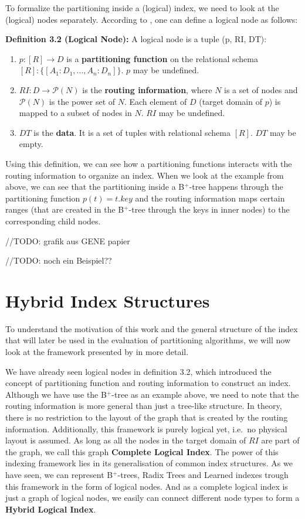 To formalize the partitioning inside a (logical) index, we need to look at the (logical) nodes separately. According to \citeauthor{Dittrich2021} \cite{Dittrich2021}, one can define a logical node as follows:

\vspace{0.5cm}
\noindent \textbf{Definition 3.2 (Logical Node):}
A logical node is a tuple (p, RI, DT):
\begin{enumerate}
    \item $p: [R] \rightarrow D$ is a \textbf{partitioning function} on the relational schema $[R] : \{ [A_1 : D_1, ..., A_n : D_n] \}$. $p$ may be undefined.
    \item $RI : D \rightarrow \mathcal{P}(N)$ is the \textbf{routing information}, where $N$ is a set of nodes and $\mathcal{P}(N)$ is the power set of $N$. Each element of $D$ (target domain of $p$) is mapped to a subset of nodes in $N$. $RI$ may be undefined.
    \item $DT$ is the \textbf{data}. It is a set of tuples with relational schema $[R]$. $DT$ may be empty.
\end{enumerate}

\noindent Using this definition, we can see how a partitioning functions interacts with the routing information to organize an index. When we look at the example from above, we can see that the partitioning inside a B$^+$-tree happens through the partitioning function $p(t) = t.key$ and the routing information maps certain ranges (that are created in the B$^+$-tree through the keys in inner nodes) to the corresponding child nodes.

//TODO: grafik aus GENE papier

//TODO: noch ein Beispiel??

\section{Hybrid Index Structures}\label{bg:hybrid}
To understand the motivation of this work and the general structure of the index that will later be used in the evaluation of partitioning algorithms, we will now look at the framework presented by \citeauthor{Dittrich2021} \cite{Dittrich2021} in more detail.

We have already seen logical nodes in definition 3.2, which introduced the concept of partitioning function and routing information to construct an index. Although we have use the B$^+$-tree as an example above, we need to note that the routing information is more general than just a tree-like structure. In theory, there is no restriction to the layout of the graph that is created by the routing information. Additionally, this framework is purely logical yet, i.e.~no physical layout is assumed. As long as all the nodes in the target domain of $RI$ are part of the graph, we call this graph \textbf{Complete Logical Index}. The power of this indexing framework lies in its generalisation of common index structures. As we have seen, we can represent B$^+$-trees, Radix Trees and Learned indexes trough this framework in the form of logical nodes. And as a complete logical index is just a graph of logical nodes, we easily can connect different node types to form a \textbf{Hybrid Logical Index}. 

